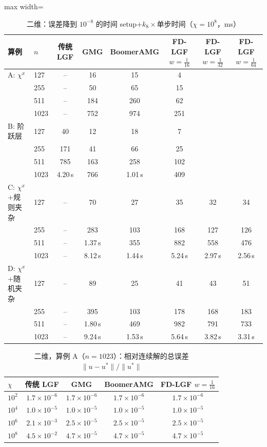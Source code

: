 \begin{table}[H]\centering\small
\caption{二维：误差降到 $10^{-8}$ 的时间 setup$+k_8\times$单步时间（$\chi=10^8$，ms）}\label{tab:t82d}
\begin{adjustbox}{max width=\textwidth}
\begin{tabular}{llcccccc}
\toprule
算例 & $n$ & 传统 LGF & GMG & BoomerAMG & FD-LGF $w{=}\frac1{16}$ & FD-LGF $w{=}\frac1{32}$ & FD-LGF $w{=}\frac1{64}$ \\
\midrule
A: $\chi^x$ & 127 & -- & 16 & 15 & 4 &  &  \\
 & 255 & -- & 50 & 65 & 15 &  &  \\
 & 511 & -- & 184 & 260 & 62 &  &  \\
 & 1023 & -- & 752 & 974 & 251 &  &  \\
\midrule
B: 阶跃层 & 127 & 40 & 12 & 18 & 7 &  &  \\
 & 255 & 171 & 41 & 66 & 25 &  &  \\
 & 511 & 785 & 163 & 258 & 102 &  &  \\
 & 1023 & 4.20\,s & 766 & 1.01\,s & 409 &  &  \\
\midrule
C: $\chi^x$+规则夹杂 & 127 & -- & 70 & 27 & 35 & 32 & 34 \\
 & 255 & -- & 283 & 103 & 168 & 127 & 126 \\
 & 511 & -- & 1.37\,s & 355 & 882 & 558 & 476 \\
 & 1023 & -- & 8.12\,s & 1.44\,s & 5.24\,s & 2.97\,s & 2.56\,s \\
\midrule
D: $\chi^x$+随机夹杂 & 127 & -- & 89 & 25 & 41 & 43 & 51 \\
 & 255 & -- & 395 & 103 & 178 & 168 & 183 \\
 & 511 & -- & 1.80\,s & 469 & 982 & 791 & 733 \\
 & 1023 & -- & 9.24\,s & 1.53\,s & 5.64\,s & 3.82\,s & 3.31\,s \\
\bottomrule
\end{tabular}
\end{adjustbox}
\end{table}

\begin{table}[H]\centering\small
\caption{二维，算例 A（$n=1023$）：相对连续解的总误差 $\|u-u^*\|/\|u^*\|$}\label{tab:aerr二维}
\begin{tabular}{lcccc}
\toprule
$\chi$ & 传统 LGF & GMG & BoomerAMG & FD-LGF $w{=}\frac1{16}$ \\
\midrule
$10^{2}$ & $1.7{\times}10^{-6}$ & $1.7{\times}10^{-6}$ & $1.7{\times}10^{-6}$ & $1.7{\times}10^{-6}$ \\
$10^{4}$ & $1.0{\times}10^{-5}$ & $1.0{\times}10^{-5}$ & $1.0{\times}10^{-5}$ & $1.0{\times}10^{-5}$ \\
$10^{6}$ & $2.1{\times}10^{-3}$ & $2.5{\times}10^{-5}$ & $2.5{\times}10^{-5}$ & $2.5{\times}10^{-5}$ \\
$10^{8}$ & $4.5{\times}10^{-2}$ & $4.7{\times}10^{-5}$ & $4.7{\times}10^{-5}$ & $4.7{\times}10^{-5}$ \\
\bottomrule
\end{tabular}
\end{table}